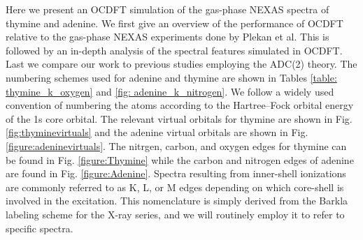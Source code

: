 \documentclass[12pt]{article}
\begin{document}
Here we present an OCDFT simulation of the gas-phase NEXAS spectra of thymine and adenine. We first give an overview of the performance of OCDFT relative to the gas-phase NEXAS experiments done by Plekan et al. \cite{plekan_theoretical_2008} This is followed by an in-depth analysis of the spectral features simulated in OCDFT. Last we compare our work to previous studies employing the ADC(2) theory. The numbering schemes used for adenine and thymine are shown in Tables \ref{table: thymine_k_oxygen} and \ref{fig: adenine_k_nitrogen}. We follow a widely used convention of numbering the atoms according to the Hartree--Fock orbital energy of the 1s core orbital. The relevant virtual orbitals  for thymine are shown in Fig. \ref{fig:thyminevirtuals} and the adenine virtual orbitals are shown in Fig. \ref{figure:adeninevirtuals}.  The nitrgen, carbon, and oxygen edges for thymine can be found in Fig. \ref{figure:Thymine} while the carbon and nitrogen edges of adenine are found in Fig. \ref{figure:Adenine}. Spectra resulting from inner-shell ionizations are commonly referred to as K, L, or M edges depending on which core-shell is involved in the excitation. This nomenclature is simply derived from the Barkla labeling scheme for the X-ray series, and we will routinely employ it to refer to specific spectra.
\end{document}
